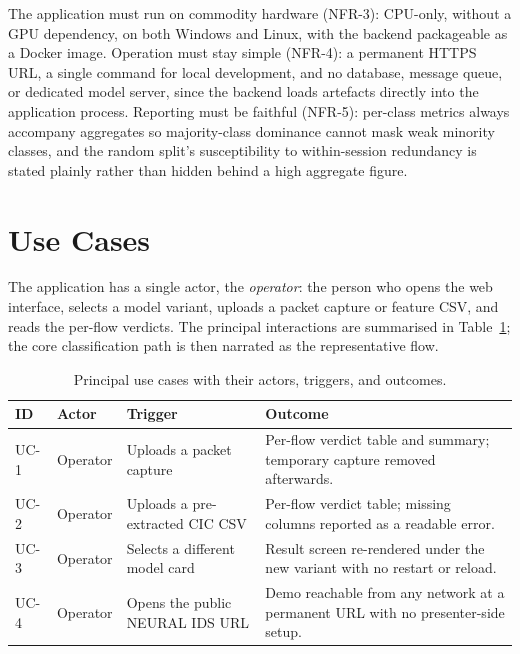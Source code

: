 \par The application must run on commodity hardware (NFR-3): CPU-only, without a GPU dependency, on both Windows and Linux, with the backend packageable as a Docker image. Operation must stay simple (NFR-4): a permanent HTTPS URL, a single command for local development, and no database, message queue, or dedicated model server, since the backend loads artefacts directly into the application process. Reporting must be faithful (NFR-5): per-class metrics always accompany aggregates so majority-class dominance cannot mask weak minority classes, and the random split's susceptibility to within-session redundancy is stated plainly rather than hidden behind a high aggregate figure.

\section{Use Cases}
\label{sec:use_cases}

\par The application has a single actor, the \emph{operator}: the person who opens the web interface, selects a model variant, uploads a packet capture or feature CSV, and reads the per-flow verdicts. The principal interactions are summarised in Table~\ref{tab:use_cases}; the core classification path is then narrated as the representative flow.

\begin{table}[htbp]
\begin{center}
\begin{tabular}{|p{34pt}|p{92pt}|p{95pt}|p{125pt}|}
\hline
\textbf{ID} & \textbf{Actor} & \textbf{Trigger} & \textbf{Outcome} \\
\hline
\hline UC-1 & Operator & Uploads a packet capture & Per-flow verdict table and summary; temporary capture removed afterwards. \\
\hline UC-2 & Operator & Uploads a pre-extracted CIC CSV & Per-flow verdict table; missing columns reported as a readable error. \\
\hline UC-3 & Operator & Selects a different model card & Result screen re-rendered under the new variant with no restart or reload. \\
\hline UC-4 & Operator & Opens the public NEURAL IDS URL & Demo reachable from any network at a permanent URL with no presenter-side setup. \\
\hline
\end{tabular}
\end{center}
\caption{Principal use cases with their actors, triggers, and outcomes.}
\label{tab:use_cases}
\end{table}

